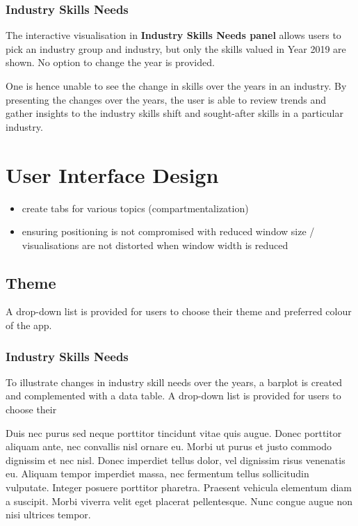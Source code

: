\documentclass{acm_proc_article-sp}
\providecommand{\tightlist}{%
  \setlength{\itemsep}{0pt}\setlength{\parskip}{0pt}}
\begin{document}
\hypertarget{industry-skills-needs}{%
\subsubsection{Industry Skills Needs}\label{industry-skills-needs}}

The interactive visualisation in \textbf{Industry Skills Needs panel}
allows users to pick an industry group and industry, but only the skills
valued in Year 2019 are shown. No option to change the year is provided.

One is hence unable to see the change in skills over the years in an
industry. By presenting the changes over the years, the user is able to
review trends and gather insights to the industry skills shift and
sought-after skills in a particular industry.

\hypertarget{user-interface-design}{%
\section{User Interface Design}\label{user-interface-design}}

\begin{itemize}
\tightlist
\item
  create tabs for various topics (compartmentalization)
\item
  ensuring positioning is not compromised with reduced window size /
  visualisations are not distorted when window width is reduced
\end{itemize}

\hypertarget{theme}{%
\subsection{Theme}\label{theme}}

A drop-down list is provided for users to choose their theme and
preferred colour of the app.

\hypertarget{industry-skills-needs-1}{%
\subsubsection{Industry Skills Needs}\label{industry-skills-needs-1}}

To illustrate changes in industry skill needs over the years, a barplot
is created and complemented with a data table. A drop-down list is
provided for users to choose their

Duis nec purus sed neque porttitor tincidunt vitae quis augue. Donec
porttitor aliquam ante, nec convallis nisl ornare eu. Morbi ut purus et
justo commodo dignissim et nec nisl. Donec imperdiet tellus dolor, vel
dignissim risus venenatis eu. Aliquam tempor imperdiet massa, nec
fermentum tellus sollicitudin vulputate. Integer posuere porttitor
pharetra. Praesent vehicula elementum diam a suscipit. Morbi viverra
velit eget placerat pellentesque. Nunc congue augue non nisi ultrices
tempor.
\end{document}
